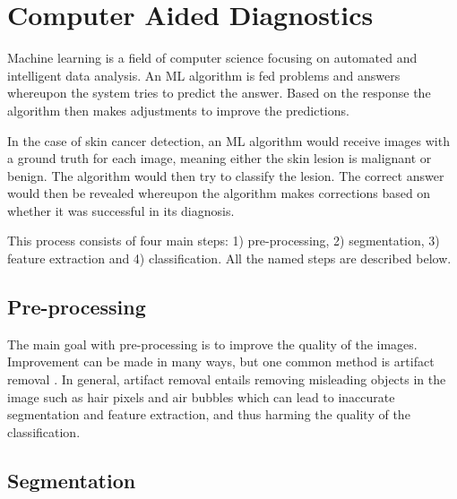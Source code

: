 \documentclass{kththesis}
\begin{document}

\section{Computer Aided Diagnostics} %


Machine learning is a field of computer science focusing on automated and intelligent data analysis. An ML algorithm is fed problems and answers whereupon the system tries to predict the answer. Based on the response the algorithm then makes adjustments to improve the predictions. \parencite{das2021machine}

In the case of skin cancer detection, an ML algorithm would receive images with a ground truth for each image, meaning either the skin lesion is malignant or benign. The algorithm would then try to classify the lesion. The correct answer would then be revealed whereupon the algorithm makes corrections based on whether it was successful in its diagnosis.

This process consists of four main steps: 1) pre-processing, 2) segmentation, 3) feature extraction and 4) classification. All the named steps are described below.

\subsection{Pre-processing}

The main goal with pre-processing is to improve the quality of the images. Improvement can be made in many ways, but one common method is artifact removal \parencite{8377976}.
In general, artifact removal entails removing misleading objects in the image such as hair pixels and air bubbles which can lead to inaccurate segmentation and feature extraction, and thus harming the quality of the classification. \parencite{jaworek2016automatic}


\subsection{Segmentation}
\end{document}
